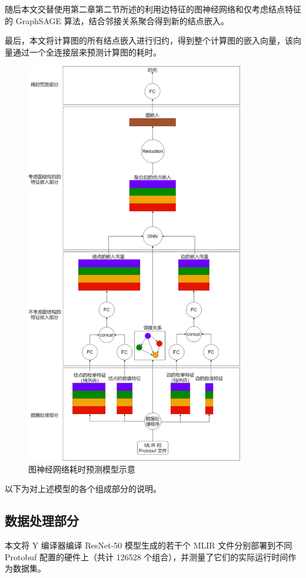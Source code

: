 随后本文交替使用第二章第二节所述的利用边特征的图神经网络和仅考虑结点特征的 GraphSAGE 算法，结合邻接关系聚合得到新的结点嵌入。

最后，本文将计算图的所有结点嵌入进行归约，得到整个计算图的嵌入向量，该向量通过一个全连接层来预测计算图的耗时。

\begin{figure}[H]
    \includegraphics[width=0.85\textwidth,height=0.95\textheight]{figures/model.png}
    \caption{图神经网络耗时预测模型示意}
    \label{fig:graph8}
\end{figure}

以下为对上述模型的各个组成部分的说明。

\subsection{数据处理部分}
本文将 Y 编译器编译 ResNet-50 模型生成的若干个 MLIR 文件分别部署到不同 Protobuf 配置的硬件上（共计 126528 个组合），并测量了它们的实际运行时间作为数据集。

